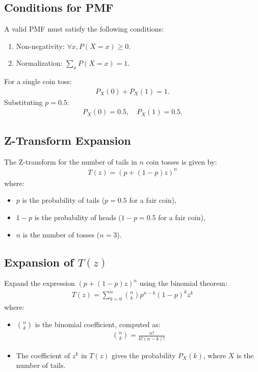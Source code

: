 \documentclass[journal]{IEEEtran}
\begin{document}
\subsection*{Conditions for PMF}
A valid PMF must satisfy the following conditions:
\begin{enumerate}
    \item Non-negativity: \(\forall x, P(X = x) \geq 0\).
    \item Normalization: \(\sum_{x} P(X = x) = 1\).
\end{enumerate}
For a single coin toss:
\begin{align}
P_X(0) + P_X(1) = 1.
\end{align}
Substituting \(p = 0.5\):
\begin{align}
P_X(0) = 0.5, \quad P_X(1) = 0.5.
\end{align}

\subsection*{Z-Transform Expansion}
The Z-transform for the number of tails in \(n\) coin tosses is given by:
\begin{align}
T(z) = \left( p + (1-p)z \right)^n
\end{align}
where:
\begin{itemize}
    \item \(p\) is the probability of tails (\(p = 0.5\) for a fair coin),
    \item \(1-p\) is the probability of heads (\(1-p = 0.5\) for a fair coin),
    \item \(n\) is the number of tosses (\(n = 3\)).
\end{itemize}

\subsection*{Expansion of \(T(z)\)}
Expand the expression \(\left( p + (1-p)z \right)^n\) using the binomial theorem:
\begin{align}
T(z) = \sum_{k=0}^{n} \binom{n}{k} p^{n-k} (1-p)^k z^k
\end{align}
where:
\begin{itemize}
    \item \(\binom{n}{k}\) is the binomial coefficient, computed as:
    \begin{align}
    \binom{n}{k} = \frac{n!}{k! (n-k)!}
    \end{align}
    \item The coefficient of \(z^k\) in \(T(z)\) gives the probability \(P_X(k)\), where \(X\) is the number of tails.
\end{itemize}
\end{document}
